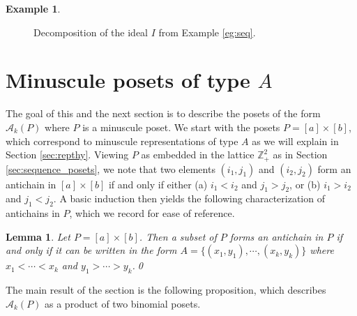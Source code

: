 \documentclass[11pt]{amsart}
\theoremstyle{plain}
\newtheorem{lemma}[theorem]{Lemma}
\theoremstyle{definition}
\newtheorem{example}[theorem]{Example}
\theoremstyle{remark}
\numberwithin{equation}{section}
\newcommand{\Z}{{\mathbb Z}}
\newcommand{\akp}{\mathcal{A}_k(P)}
\begin{document}
\begin{example}
\begin{figure}[h!]
\caption{Decomposition of the ideal $I$ from Example \ref{eg:seq}.}
\label{fig:ferrers}
\end{figure}
\end{example}



\section{Minuscule posets of type \texorpdfstring{$A$}{A}}\label{sec:type_A}



The goal of this and the next section is to describe the posets of the form
$\akp$ where $P$ is a minuscule poset. We start with the posets
$P=[a]\times[b]$, which correspond to minuscule representations of type $A$ as
we will explain in Section \ref{sec:repthy}. Viewing $P$ as embedded in the
lattice $\Z_+^2$ as in Section \ref{sec:sequence_posets}, we note that two
elements $(i_1,j_1)$ and $(i_2, j_2)$ form an antichain in $[a]\times [b]$ if and
only if either (a) $i_1 < i_2$ and $j_1 > j_2$, or (b) $i_1 > i_2$ and $j_1 <
j_2$. A basic induction then yields the
following characterization of antichains in $P$, which we record for ease of
reference.

\begin{lemma}
\label{lem:jab_antichain}
Let $P=[a]\times[b]$. Then a subset of $P$ forms an antichain in $P$ if and
only if it can be written in the form $A=\{(x_1,y_1), \cdots, (x_k,y_k)\}$ where
$x_1 < \cdots < x_k$ and $y_1 > \cdots > y_k$.\qed
\end{lemma}


The main result of the section is the following proposition, which describes
$\akp$ as a product of two binomial posets.
\end{document}
